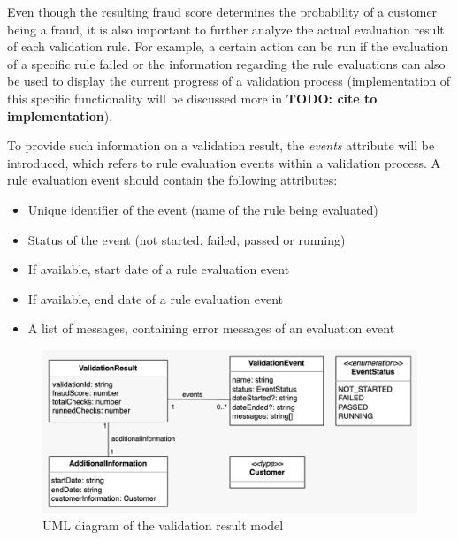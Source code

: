     Even though the resulting fraud score determines the probability of a customer being a fraud, it is also important to further analyze the actual evaluation result of each validation rule. For example, a certain action can be run if the evaluation of a specific rule failed or the information regarding the rule evaluations can also be used to display the current progress of a validation process (implementation of this specific functionality will be discussed more in \textbf{TODO: cite to implementation}). 

    To provide such information on a validation result, the \emph{events} attribute will be introduced, which refers to rule evaluation events within a validation process. A rule evaluation event should contain the following attributes:

    \begin{itemize}
      \item Unique identifier of the event (name of the rule being evaluated)
      \item Status of the event (not started, failed, passed or running) 
      \item If available, start date of a rule evaluation event 
      \item If available, end date of a rule evaluation event 
      \item A list of messages, containing error messages of an evaluation event
    \end{itemize}

    \begin{figure}[!ht]
      \includegraphics[width=\textwidth]{diagrams/entity_validation_result.jpeg}
      \caption{UML diagram of the validation result model}
      \label{fig:uml_validation_result}
    \end{figure}
    
